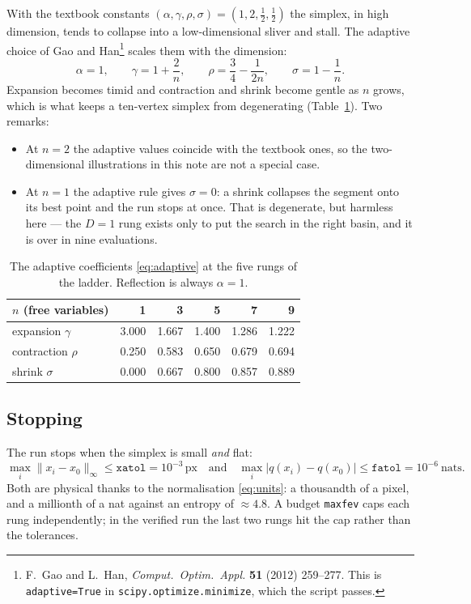 \documentclass[11pt,a4paper]{article}
\newcommand{\px}{\,\text{px}}
\begin{document}
With the textbook constants $(\alpha,\gamma,\rho,\sigma)=(1,2,\tfrac12,
\tfrac12)$ the simplex, in high dimension, tends to collapse into a
low-dimensional sliver and stall.  The adaptive choice of Gao and
Han\footnote{F.~Gao and L.~Han, \emph{Comput.\ Optim.\ Appl.} \textbf{51}
(2012) 259--277.  This is \texttt{adaptive=True} in
\texttt{scipy.optimize.minimize}, which the script passes.} scales them with
the dimension:
\begin{equation}
  \alpha=1,\qquad
  \gamma=1+\frac2n,\qquad
  \rho=\frac34-\frac1{2n},\qquad
  \sigma=1-\frac1n .
  \label{eq:adaptive}
\end{equation}
Expansion becomes timid and contraction and shrink become gentle as $n$ grows,
which is what keeps a ten-vertex simplex from degenerating
(Table~\ref{tab:adaptive}).  Two remarks:
\begin{itemize}
\item At $n=2$ the adaptive values coincide with the textbook ones, so the
  two-dimensional illustrations in this note are not a special case.
\item At $n=1$ the adaptive rule gives $\sigma=0$: a shrink collapses the
  segment onto its best point and the run stops at once.  That is degenerate,
  but harmless here --- the $D=1$ rung exists only to put the search in the
  right basin, and it is over in nine evaluations.
\end{itemize}

\begin{table}[htb]
\centering
\begin{tabular}{lrrrrr}
\toprule
$n$ (free variables) & 1 & 3 & 5 & 7 & 9 \\
\midrule
expansion   $\gamma$ & 3.000 & 1.667 & 1.400 & 1.286 & 1.222 \\
contraction $\rho$   & 0.250 & 0.583 & 0.650 & 0.679 & 0.694 \\
shrink      $\sigma$ & 0.000 & 0.667 & 0.800 & 0.857 & 0.889 \\
\bottomrule
\end{tabular}
\caption{The adaptive coefficients \eqref{eq:adaptive} at the five rungs of
the ladder.  Reflection is always $\alpha=1$.}
\label{tab:adaptive}
\end{table}

\subsection{Stopping}

The run stops when the simplex is small \emph{and} flat:
\begin{equation}
  \max_i\lVert x_i-x_0\rVert_\infty \le \mathtt{xatol}=10^{-3}\px
  \quad\text{and}\quad
  \max_i|q(x_i)-q(x_0)| \le \mathtt{fatol}=10^{-6}\ \text{nats}.
\end{equation}
Both are physical thanks to the normalisation \eqref{eq:units}: a thousandth
of a pixel, and a millionth of a nat against an entropy of $\approx4.8$.  A
budget \texttt{maxfev} caps each rung independently; in the verified run the
last two rungs hit the cap rather than the tolerances.
\end{document}
